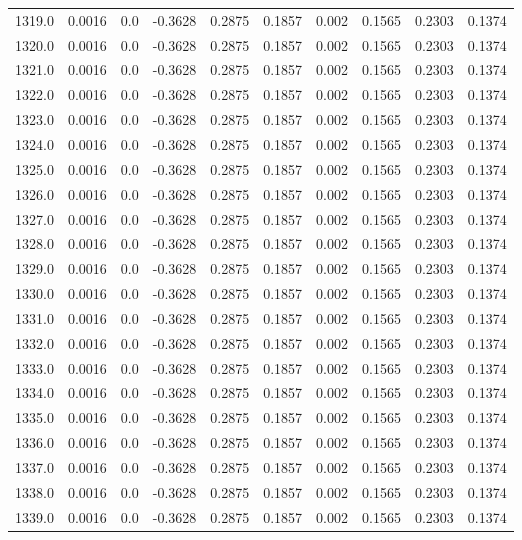 \begin{longtable}{lrrrrrrrrr}
1319.0 & 0.0016 & 0.0 & -0.3628 & 0.2875 & 0.1857 & 0.002 & 0.1565 & 0.2303 & 0.1374 \\
1320.0 & 0.0016 & 0.0 & -0.3628 & 0.2875 & 0.1857 & 0.002 & 0.1565 & 0.2303 & 0.1374 \\
1321.0 & 0.0016 & 0.0 & -0.3628 & 0.2875 & 0.1857 & 0.002 & 0.1565 & 0.2303 & 0.1374 \\
1322.0 & 0.0016 & 0.0 & -0.3628 & 0.2875 & 0.1857 & 0.002 & 0.1565 & 0.2303 & 0.1374 \\
1323.0 & 0.0016 & 0.0 & -0.3628 & 0.2875 & 0.1857 & 0.002 & 0.1565 & 0.2303 & 0.1374 \\
1324.0 & 0.0016 & 0.0 & -0.3628 & 0.2875 & 0.1857 & 0.002 & 0.1565 & 0.2303 & 0.1374 \\
1325.0 & 0.0016 & 0.0 & -0.3628 & 0.2875 & 0.1857 & 0.002 & 0.1565 & 0.2303 & 0.1374 \\
1326.0 & 0.0016 & 0.0 & -0.3628 & 0.2875 & 0.1857 & 0.002 & 0.1565 & 0.2303 & 0.1374 \\
1327.0 & 0.0016 & 0.0 & -0.3628 & 0.2875 & 0.1857 & 0.002 & 0.1565 & 0.2303 & 0.1374 \\
1328.0 & 0.0016 & 0.0 & -0.3628 & 0.2875 & 0.1857 & 0.002 & 0.1565 & 0.2303 & 0.1374 \\
1329.0 & 0.0016 & 0.0 & -0.3628 & 0.2875 & 0.1857 & 0.002 & 0.1565 & 0.2303 & 0.1374 \\
1330.0 & 0.0016 & 0.0 & -0.3628 & 0.2875 & 0.1857 & 0.002 & 0.1565 & 0.2303 & 0.1374 \\
1331.0 & 0.0016 & 0.0 & -0.3628 & 0.2875 & 0.1857 & 0.002 & 0.1565 & 0.2303 & 0.1374 \\
1332.0 & 0.0016 & 0.0 & -0.3628 & 0.2875 & 0.1857 & 0.002 & 0.1565 & 0.2303 & 0.1374 \\
1333.0 & 0.0016 & 0.0 & -0.3628 & 0.2875 & 0.1857 & 0.002 & 0.1565 & 0.2303 & 0.1374 \\
1334.0 & 0.0016 & 0.0 & -0.3628 & 0.2875 & 0.1857 & 0.002 & 0.1565 & 0.2303 & 0.1374 \\
1335.0 & 0.0016 & 0.0 & -0.3628 & 0.2875 & 0.1857 & 0.002 & 0.1565 & 0.2303 & 0.1374 \\
1336.0 & 0.0016 & 0.0 & -0.3628 & 0.2875 & 0.1857 & 0.002 & 0.1565 & 0.2303 & 0.1374 \\
1337.0 & 0.0016 & 0.0 & -0.3628 & 0.2875 & 0.1857 & 0.002 & 0.1565 & 0.2303 & 0.1374 \\
1338.0 & 0.0016 & 0.0 & -0.3628 & 0.2875 & 0.1857 & 0.002 & 0.1565 & 0.2303 & 0.1374 \\
1339.0 & 0.0016 & 0.0 & -0.3628 & 0.2875 & 0.1857 & 0.002 & 0.1565 & 0.2303 & 0.1374 \\

\end{longtable}
